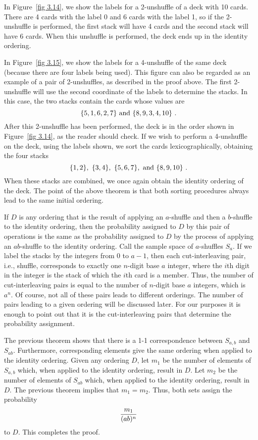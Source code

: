 \par
In Figure~\ref{fig 3.14}, we show the labels for a 2-unshuffle of a deck with 10 cards.  There
are 4 cards with the label 0 and 6 cards with the label 1, so if the 2-unshuffle is performed,
the first stack will have 4 cards and the second stack will have 6 cards.  When this unshuffle is
performed, the deck ends up in the identity ordering.
\par
In Figure~\ref{fig 3.15}, we show the labels for a 4-unshuffle of the same deck (because there
are four labels being used).  This figure can also be regarded as an example of a pair of
2-unshuffles, as described in the proof above.  The first 2-unshuffle will use the second coordinate
of the labels to determine the stacks.  In this case, the two stacks contain the cards whose values
are 
$$
\{5, 1, 6, 2, 7\}\ {\rm and}\ \{8, 9, 3, 4, 10\}\ .
$$ 
After this 2-unshuffle has been performed, the
deck is in the order shown in Figure~\ref{fig 3.14}, as the reader should check.  If we wish to
perform a 4-unshuffle on the deck, using the labels shown, we sort the cards lexicographically,
obtaining the four stacks
$$
\{1, 2\},\ \{3, 4\},\ \{5, 6, 7\},\ {\rm and}\ \{8, 9, 10\}\ .
$$
When these stacks are combined, we once again obtain the identity ordering of the deck.
The point of the above theorem is that both sorting procedures always lead to the same initial
ordering.
\begin{theorem}\label{thm 3.3.2} If $D$ is any ordering that is the result of applying
an $a$-shuffle and then a $b$-shuffle to the identity ordering, then the probability
assigned to $D$ by this pair of operations is the same as the probability assigned to $D$ by the
process of applying an $ab$-shuffle to the identity ordering.
\proof Call the sample space of $a$-shuffles $S_a$.  If we label the stacks by the
integers from $0$ to $a-1$, then each cut-interleaving pair, i.e., shuffle, corresponds to
exactly one
$n$-digit base $a$ integer, where the $i$th digit in the integer is the stack of
which the $i$th card is a member.  Thus, the number of cut-interleaving pairs 
is equal to the number of
$n$-digit base $a$ integers, which is $a^n$.  Of course, not all of these pairs leads
to different orderings.  The number of pairs leading to a given ordering will be
discussed later.  For our purposes it is enough to point out that it is the
cut-interleaving pairs that determine the probability assignment.
\par The previous theorem shows that there is a 1-1 correspondence between $S_{a,b}$
and $S_{ab}$.  Furthermore, corresponding elements give the same ordering when applied to
the identity ordering. Given any ordering $D$, let $m_1$ be the number of elements of
$S_{a,b}$ which, when applied to the identity ordering, result in $D$.  Let $m_2$ be
the number of elements of $S_{ab}$ which, when applied to the identity ordering,
result in $D$.  The previous theorem implies that $m_1 = m_2$.  Thus, both sets assign
the probability
$${{m_1}\over{(ab)^n}}$$
to $D$.  This completes the proof.
\end{theorem}
